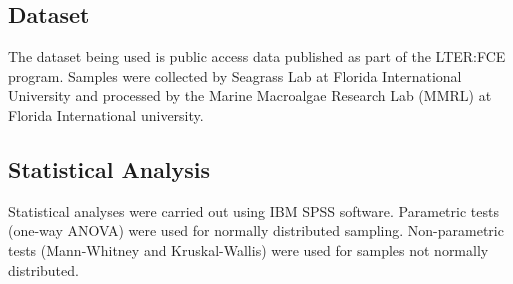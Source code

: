 \documentclass[]{article}
\begin{document}
\hypertarget{dataset}{%
\subsection{Dataset}\label{dataset}}

The dataset being used is public access data published as part of the
LTER:FCE program. Samples were collected by Seagrass Lab at Florida
International University and processed by the Marine Macroalgae Research
Lab (MMRL) at Florida International university.

\hypertarget{statistical-analysis}{%
\subsection{Statistical Analysis}\label{statistical-analysis}}

Statistical analyses were carried out using IBM SPSS software.
Parametric tests (one-way ANOVA) were used for normally distributed
sampling. Non-parametric tests (Mann-Whitney and Kruskal-Wallis) were
used for samples not normally distributed.
\end{document}
